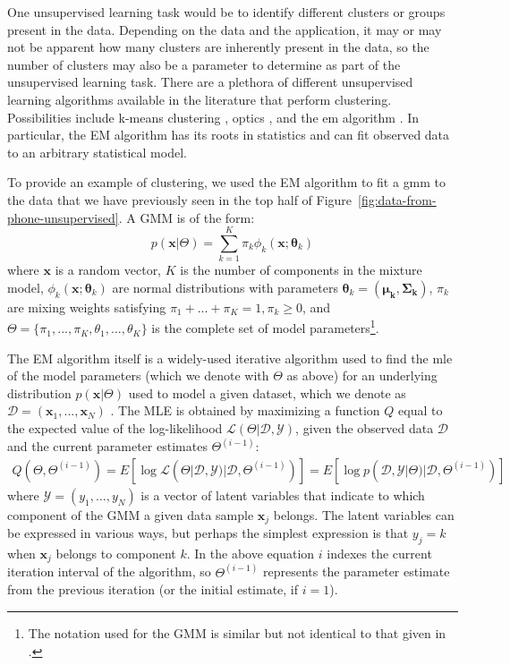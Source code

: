 One unsupervised learning task would be to identify different clusters or groups present in the data. Depending on the data and the application, it may or may not be apparent how many clusters are inherently present in the data, so the number of clusters may also be a parameter to determine as part of the unsupervised learning task. There are a plethora of different unsupervised learning algorithms available in the literature that perform clustering. Possibilities include k-means clustering \cite{hartigan1979algorithm}, \acrshort{optics} \cite{Ankerst:1999:OOP:304181.304187}, and the \gls{em} algorithm \cite{dempster1977maximum}. In particular, the EM algorithm has its roots in statistics and can fit observed data to an arbitrary statistical model.

To provide an example of clustering, we used the EM algorithm to fit a \gls{gmm} to the data that we have previously seen in the top half of Figure~\ref{fig:data-from-phone-unsupervised}. A GMM is of the form:
%
\begin{equation}
 p(\mathbf{x}|\Theta) = \sum\limits_{k=1}^K \pi_k \phi_k(\mathbf{x}; \boldsymbol{\theta}_k)
\end{equation}
%
where $\mathbf{x}$ is a random vector, $K$ is the number of components in the mixture model, $\phi_k(\mathbf{x}; \boldsymbol{\theta}_k)$ are normal distributions with parameters $\boldsymbol{\theta}_k = (\boldsymbol{\mu_k}, \mathbf{\Sigma_k})$, $\pi_k$ are mixing weights satisfying $\pi_1 + ... + \pi_K = 1, \pi_k \geq 0$, and $\Theta = \{\pi_1,...,\pi_K,\theta_1, ..., \theta_K\}$ is the complete set of model parameters\footnote{The notation used for the GMM is similar but not identical to that given in \cite{bilmes1998gentle}.}.

The EM algorithm itself is a widely-used iterative algorithm used to find the \gls{mle} of the model parameters (which we denote with $\Theta$ as above) for an underlying distribution $p(\mathbf{x}|\Theta)$ used to model a given dataset, which we denote as $\mathcal{D} = (\mathbf{x}_1,..., \mathbf{x}_N)$ \cite{bilmes1998gentle}. The MLE is obtained by maximizing a function $Q$ equal to the expected value of the log-likelihood $\mathcal{L}(\Theta|\mathcal{D},\mathcal{Y})$, given the observed data $\mathcal{D}$ and the current parameter estimates $\Theta^{(i-1)}$:
%
\begin{gather}
  Q(\Theta,\Theta^{(i-1)}) = E[\log \mathcal{L}(\Theta|\mathcal{D}, \mathcal{Y})|\mathcal{D},\Theta^{(i-1)})]
     = E[\log p(\mathcal{D}, \mathcal{Y}|\Theta)|\mathcal{D},\Theta^{(i-1)})]
\end{gather}
%
where $\mathcal{Y} = (y_1, ..., y_N)$ is a vector of latent variables that indicate to which component of the GMM a given data sample $\mathbf{x}_j$ belongs. The latent variables can be expressed in various ways, but perhaps the simplest expression is that $y_j = k$ when $\mathbf{x}_j$ belongs to component $k$. In the above equation $i$ indexes the current iteration interval of the algorithm, so $\Theta^{(i-1)}$ represents the parameter estimate from the previous iteration (or the initial estimate, if $i=1$).


